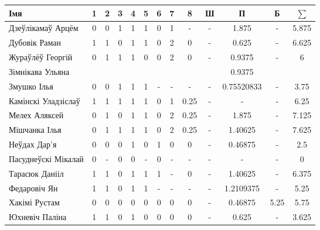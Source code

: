 \begin{table}[H]
	\begin{minipage}{\textwidth}
		\begin{tabular}{|l|c|c|c|c|c|c|c|c|c|c|c|c|}
			\hline
			Імя                 &  1   & 2 & 3 &   4   &  5   & 6 &  7   &  8   &   Ш   & П &  Б   & $\sum$ \\ \hline
			Дзеўлікамаў Арцём   & 0    & 0 & 1 & 1 & 1 & 0  & 1    &  -   & -  & 1.875 & -    &  5.875 \\ \hline
			Дубовік Раман       &  1   & 1 & 0 & 1 & 1    & 0 & 2    & 0    & -     & 0.625 & -    &  6.625 \\ \hline
			Жураўлёў Георгій    &  0   & 1 & 1 & 1  & 0    & 0 & 2 & 0    & -     & 0.9375 &  -   &   6  \\ \hline
			Зімнікава Ульяна    &     &  &  &   &     &  &     &     &      & 0.9375 &     &    \\ \hline
			Змушко Ілья         &  0   & 0 & 1 & 1  & 1    & - & - & -    & - & 0.75520833 & - &  3.75 \\ \hline
			Камінскі Уладзіслаў &  1   & 1 & 1 &   1   &  1   & 0 &  1   &  0.25   &   -   & - &  -   &   6.25    \\ \hline
			Мелех Аляксей       &  0   & 1 & 0 & 1  & 1    & 0 & 2    & 0.25 &  -   &  1.875 & -  &   7.125  \\ \hline
			Мішчанка Ілья       &  0   & 1 & 1 & 1     & 1    & 0  & 2 & 0.25    & -  & 1.40625 & -    &   7.625    \\ \hline
			Неўдах Дар'я        &  0   & 0 & 0 & 1 & 0 & 1 & 0 & 0 & -     & 0.46875 &  -   & 2.5      \\ \hline
			Пасуднеўскі Мікалай & 0  & - & 0 &  0    &  -   & 0 &  -   &  -   &  -    & - & -    &  0  \\ \hline
			Тарасюк Данііл      &   1  & 1 & 0 &  1    &  1   & 1 & - &  0   & - & 1.40625 &  -   &  6.375 \\ \hline
			Федаровіч Ян        &  1   & 1 & 0 &   1   &  1   & - &  -   &  -   &   -   & 1.2109375 &  -   &   5.25    \\ \hline
			Хакімі Рустам       &  0   & 0 & 0 &  0 & 0 & 0 & 0    &  0   &   -   & 0.46875 &  5.25   &  5.75    \\ \hline
			Юхневіч Паліна      &  1   & 1 & 0 &  1    & 0 & 0 & 0 & 0 &  -    & 0.625 &  -  &  3.625  \\ \hline
		\end{tabular}
	\end{minipage}
\end{table}


